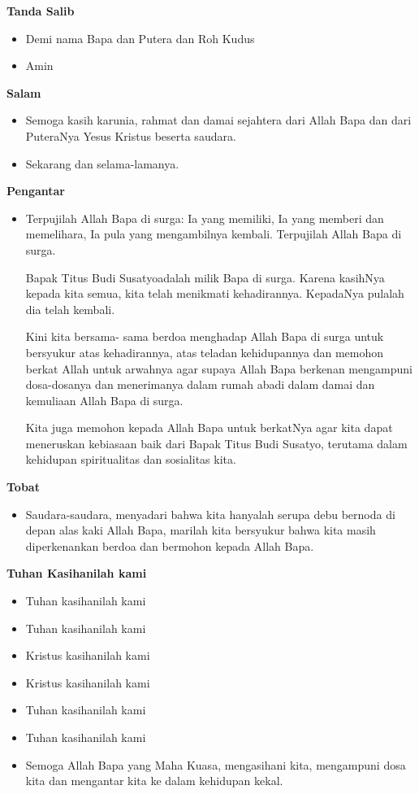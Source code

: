 \documentclass[a5paper,headsepline,titlepage,12pt,nnormalheadings,DIVcalc,twoside]{scrbook}
\makeatletter
\newcommand{\subjudul}[1]{%
  {\parindent \z@ 
    \interlinepenalty\@M \bfseries #1\par\nobreak \vskip 10\p@ }}
\newcommand{\BU}[1]{\begin{itemize} \item[U:] #1 \end{itemize}}
\newcommand{\BI}[1]{\begin{itemize} \item[I:] #1 \end{itemize}}
\newcommand{\namaalm}{Bapak Titus Budi Susatyo}
\makeatother
\begin{document}
\subjudul{Tanda Salib} 

\BI{Demi nama  Bapa dan Putera dan Roh Kudus}

\BU{Amin}

 

\subjudul{Salam}

\BI{Semoga kasih karunia, rahmat dan damai sejahtera dari 
Allah Bapa dan dari PuteraNya Yesus Kristus beserta 
saudara.} 

\BU{Sekarang dan selama-lamanya.}

 

\subjudul{Pengantar}

\BI{Terpujilah Allah Bapa di surga: Ia yang memiliki, Ia yang 
memberi dan memelihara, Ia pula yang mengambilnya 
kembali. Terpujilah Allah Bapa di surga.

\namaalm adalah milik Bapa di surga. Karena kasihNya 
kepada kita semua, kita telah menikmati kehadirannya.
KepadaNya pulalah dia telah 
kembali.

Kini kita bersama-
sama berdoa menghadap Allah Bapa di surga untuk 
bersyukur atas kehadirannya, atas teladan kehidupannya 
dan memohon berkat Allah untuk arwahnya 
agar supaya Allah Bapa berkenan mengampuni dosa-dosanya 
dan menerimanya dalam rumah abadi dalam 
damai dan kemuliaan Allah Bapa di surga. 

Kita juga memohon kepada Allah Bapa untuk berkatNya 
agar kita dapat meneruskan kebiasaan baik dari \namaalm , 
terutama dalam kehidupan spiritualitas dan 
sosialitas kita.}

 

\subjudul{Tobat}

\BI{Saudara-saudara, menyadari bahwa kita hanyalah serupa 
debu bernoda di depan alas kaki Allah Bapa, marilah kita 
bersyukur bahwa kita masih diperkenankan berdoa dan 
bermohon kepada Allah Bapa. }

 

\subjudul{Tuhan Kasihanilah kami}

\BI{Tuhan kasihanilah kami}

\BU{Tuhan kasihanilah kami}

\BI{Kristus kasihanilah kami}

\BU{Kristus kasihanilah kami}

\BI{Tuhan kasihanilah kami}

\BU{Tuhan kasihanilah kami}

\BI{Semoga Allah Bapa yang Maha Kuasa, mengasihani kita, 
mengampuni dosa kita dan mengantar kita ke dalam 
kehidupan kekal.}
\end{document}
